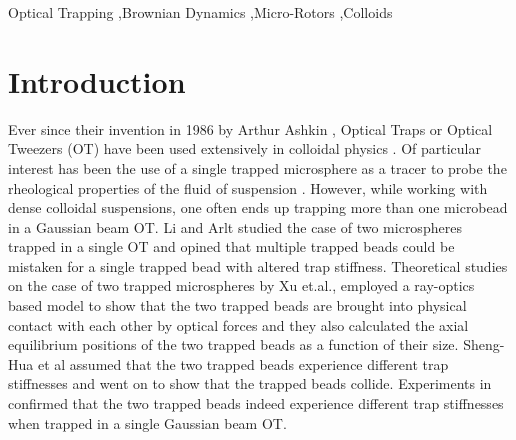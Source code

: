 \documentclass[preprint,  3p]{elsarticle}
\begin{document}
\begin{frontmatter}
		
		\begin{keyword}
			Optical Trapping \sep Brownian Dynamics \sep Micro-Rotors  \sep Colloids 
		\end{keyword}
		
	\end{frontmatter}

\section{Introduction}
Ever since their invention in 1986 by Arthur Ashkin \cite{Ashkin_1986}, Optical Traps or Optical Tweezers (OT) have been used extensively in colloidal physics \cite{Leonardo_2008, Koehler_2011, Curran_1999}. Of particular interest has been the use of a single trapped microsphere as a tracer to probe the rheological properties of the fluid of suspension \cite{Atakhorrami_2006}. However, while working with dense colloidal suspensions, one often ends up trapping more than one microbead in a Gaussian beam OT. Li and Arlt \cite{Li_2008} studied the case of two microspheres trapped in a single OT and opined that multiple trapped beads could be mistaken for a single trapped bead with altered trap stiffness. Theoretical studies on the case of two trapped microspheres by Xu et.al., \cite{Xu_2005} employed a ray-optics based model to show that the two trapped beads are brought into physical contact with each other by optical forces and they also calculated the axial equilibrium positions of the two trapped beads as a function of their size. Sheng-Hua et al \cite{ShengHua_2005} assumed that the two trapped beads experience different trap stiffnesses and went on to show that the trapped beads collide. Experiments in \cite{Praveen_2016} confirmed that the two trapped beads indeed experience different trap stiffnesses when trapped in a single Gaussian beam OT.
\end{document}
